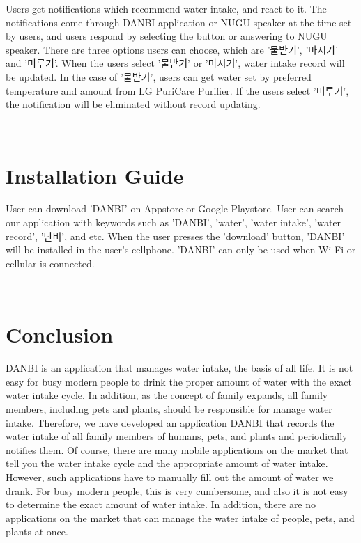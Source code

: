 \documentclass[conference]{IEEEtran}
\begin{document}
\begin{itemize}
Users get notifications which recommend water intake, and react to it. The notifications come through DANBI application or NUGU speaker at the time set by users, and users respond by selecting the button or answering to NUGU speaker. There are three options users can choose, which are '물받기', '마시기' and '미루기'. When the users select '물받기' or '마시기', water intake record will be updated. In the case of '물받기', users can get water set by preferred temperature and amount from LG PuriCare Purifier. If the users select '미루기', the notification will be eliminated without record updating.
\end{itemize}

\ 

\section{Installation Guide}
\setlength{\parindent}{2ex}
\setlength{\parskip}{0.5em}
User can download 'DANBI' on Appstore or Google Playstore.
User can search our application with keywords such as 'DANBI', ’water’,
’water intake’, ’water record', ’단비’, and etc.
When the user presses the ’download’ button, 'DANBI' will be
installed in the user’s cellphone. 'DANBI' can only be used when Wi-Fi or cellular is connected.

\ 

\section{Conclusion}
\setlength{\parindent}{2ex}
\setlength{\parskip}{0.5em}

DANBI is an application that manages water intake, the basis of all life. It is not easy for busy modern people to drink the proper amount of water with the exact water intake cycle. In addition, as the concept of family expands, all family members, including pets and plants, should be responsible for manage water intake. Therefore, we have developed an application DANBI that records the water intake of all family members of humans, pets, and plants and periodically notifies them. Of course, there are many mobile applications on the market that tell you the water intake cycle and the appropriate amount of water intake. However, such applications have to manually fill out the amount of water we drank. For busy modern people, this is very cumbersome, and also it is not easy to determine the exact amount of water intake. In addition, there are no applications on the market that can manage the water intake of people, pets, and plants at once.
\end{document}

